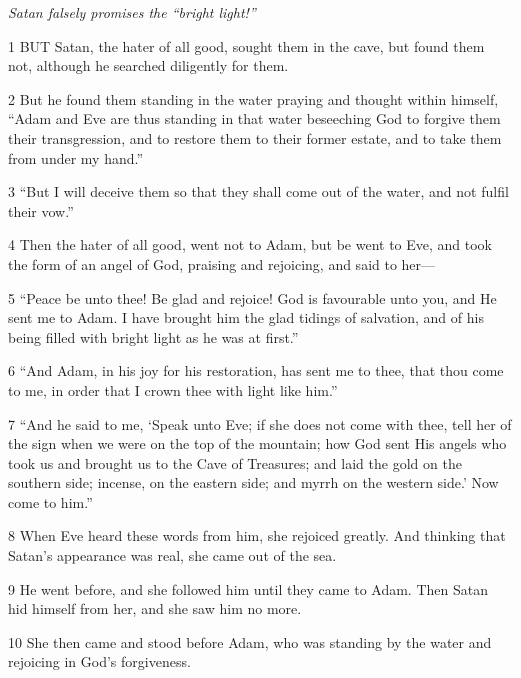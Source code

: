 \par \textit{Satan falsely promises the “bright light!”}

\par 1 BUT Satan, the hater of all good, sought them in the cave, but found them not, although he searched diligently for them.

\par 2 But he found them standing in the water praying and thought within himself, “Adam and Eve are thus standing in that water beseeching God to forgive them their transgression, and to restore them to their former estate, and to take them from under my hand.”

\par 3 “But I will deceive them so that they shall come out of the water, and not fulfil their vow.”

\par 4 Then the hater of all good, went not to Adam, but be went to Eve, and took the form of an angel of God, praising and rejoicing, and said to her—

\par 5 “Peace be unto thee! Be glad and rejoice! God is favourable unto you, and He sent me to Adam. I have brought him the glad tidings of salvation, and of his being filled with bright light as he was at first.”

\par 6 “And Adam, in his joy for his restoration, has sent me to thee, that thou come to me, in order that I crown thee with light like him.”

\par 7 “And he said to me, ‘Speak unto Eve; if she does not come with thee, tell her of the sign when we were on the top of the mountain; how God sent His angels who took us and brought us to the Cave of Treasures; and laid the gold on the southern side; incense, on the eastern side; and myrrh on the western side.’ Now come to him.”

\par 8 When Eve heard these words from him, she rejoiced greatly. And thinking that Satan's appearance was real, she came out of the sea.

\par 9 He went before, and she followed him until they came to Adam. Then Satan hid himself from her, and she saw him no more.

\par 10 She then came and stood before Adam, who was standing by the water and rejoicing in God's forgiveness.

